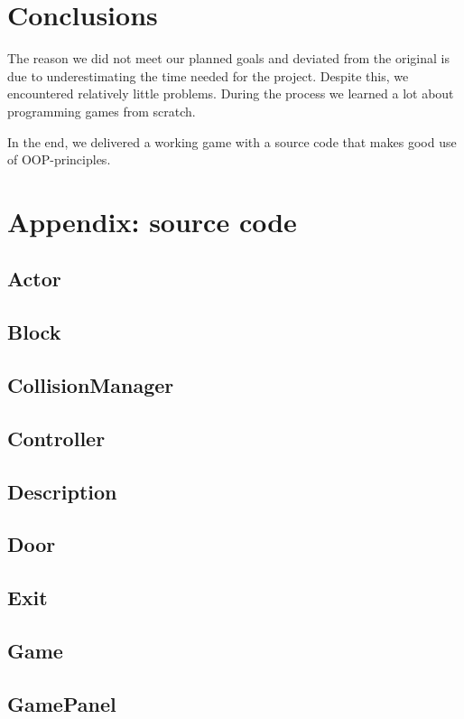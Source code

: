 \documentclass[a4paper,10pt,twoside]{article}
\begin{document}
\section{Conclusions}
The reason we did not meet our planned goals and deviated from the original is due to underestimating the time needed for the project. Despite this, we encountered relatively little problems. During the process we learned a lot about programming games from scratch.

In the end, we delivered a working game with a source code that makes good use of OOP-principles. 

\section{Appendix: source code}
\subsection{Actor}

\subsection{Block}

\subsection{CollisionManager}

\subsection{Controller}

\subsection{Description}

\subsection{Door}

\subsection{Exit}

\subsection{Game}

\subsection{GamePanel}

\end{document}

